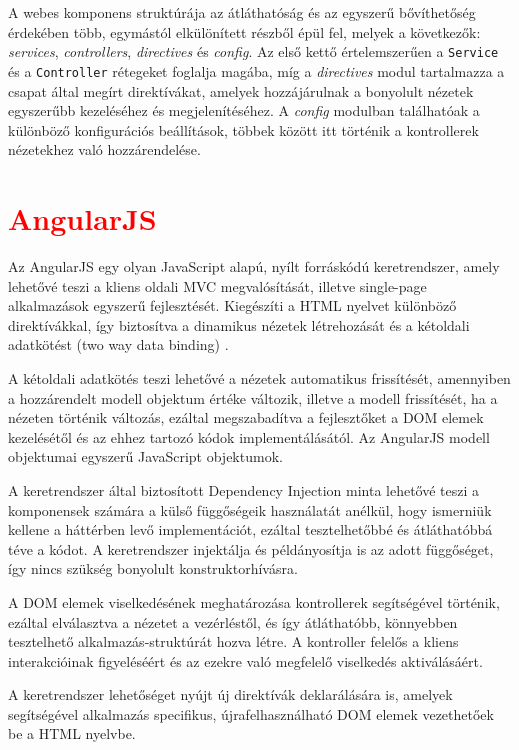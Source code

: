 A webes komponens struktúrája az átláthatóság és az egyszerű bővíthetőség érdekében több, egymástól elkülönített részből épül fel, melyek a következők: \textit{services}, \textit{controllers}, \textit{directives} és \textit{config}. Az első kettő értelemszerűen a \texttt{Service} és a \texttt{Controller} rétegeket foglalja magába, míg a \textit{directives} modul tartalmazza a csapat által megírt direktívákat, amelyek hozzájárulnak a bonyolult nézetek egyszerűbb kezeléséhez és megjelenítéséhez. A \textit{config} modulban találhatóak a különböző konfigurációs beállítások, többek között itt történik a kontrollerek nézetekhez való hozzárendelése. 

\section{\textcolor{red}{AngularJS}}
\label{sec:angularjs}
Az AngularJS egy olyan JavaScript alapú, nyílt forráskódú keretrendszer, amely lehetővé teszi a kliens oldali MVC megvalósítását, illetve single-page alkalmazások egyszerű fejlesztését. Kiegészíti a HTML nyelvet különböző direktívákkal, így biztosítva a dinamikus nézetek létrehozását és a kétoldali adatkötést (two way data binding) \cite{AngularJS}.

A kétoldali adatkötés teszi lehetővé a nézetek automatikus frissítését, amennyiben a hozzárendelt modell objektum értéke változik, illetve a modell frissítését, ha a nézeten történik változás, ezáltal megszabadítva a fejlesztőket a DOM elemek kezelésétől és az ehhez tartozó kódok implementálásától. Az AngularJS modell objektumai egyszerű JavaScript objektumok.

A keretrendszer által biztosított Dependency Injection minta lehetővé teszi a komponensek számára a külső függőségeik használatát anélkül, hogy ismerniük kellene  a háttérben levő implementációt, ezáltal tesztelhetőbbé és átláthatóbbá téve a kódot. A keretrendszer injektálja és példányosítja is az adott függőséget, így nincs szükség bonyolult konstruktorhívásra.     

A DOM elemek viselkedésének meghatározása kontrollerek segítségével történik, ezáltal elválasztva a nézetet a vezérléstől, és így átláthatóbb, könnyebben tesztelhető alkalmazás-struktúrát hozva létre. A kontroller felelős a kliens interakcióinak figyeléséért és az ezekre való megfelelő viselkedés aktiválásáért. 



A keretrendszer lehetőséget nyújt új direktívák deklarálására is, amelyek segítségével alkalmazás specifikus, újrafelhasználható DOM elemek vezethetőek be a HTML nyelvbe. 


